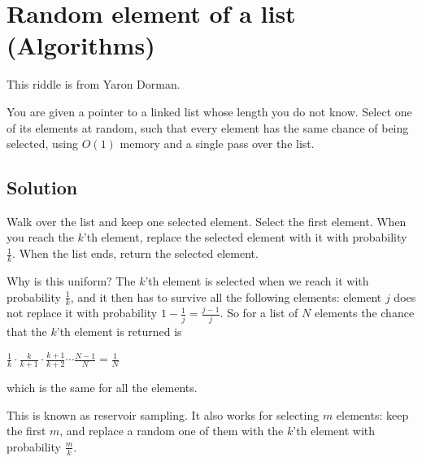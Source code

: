 \section {Random element of a list (Algorithms)}

This riddle is from Yaron Dorman.

You are given a pointer to a linked list whose length you do not know.
Select one of its elements at random, such that every element has the same chance of being selected,
using $O(1)$ memory and a single pass over the list.

\subsection{Solution}

Walk over the list and keep one selected element. Select the first element.
When you reach the $k$'th element, replace the selected element with it with probability $\frac{1}{k}$.
When the list ends, return the selected element.

Why is this uniform? The $k$'th element is selected when we reach it with probability $\frac{1}{k}$,
and it then has to survive all the following elements: element $j$ does not replace it with probability $1-\frac{1}{j} = \frac{j-1}{j}$.
So for a list of $N$ elements the chance that the $k$'th element is returned is
\begin{center}
$\frac{1}{k} \cdot \frac{k}{k+1} \cdot \frac{k+1}{k+2} \cdots \frac{N-1}{N} = \frac{1}{N}$
\end{center}
which is the same for all the elements.

This is known as reservoir sampling. It also works for selecting $m$ elements: keep the first $m$, and replace a random one of them with the $k$'th element
with probability $\frac{m}{k}$.
